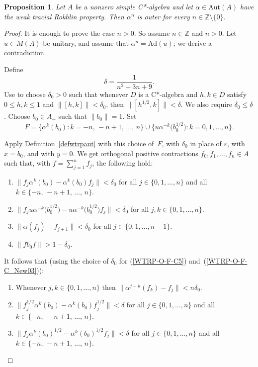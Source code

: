 \documentclass[11pt]{amsart}
\theoremstyle{plain}
\newtheorem{proposition}[theorem]{Proposition}
\theoremstyle{definition}
\theoremstyle{remark}
\numberwithin{equation}{section}
\newcounter{TmpEnumi}
\newcommand{\af}{\alpha}
\newcommand{\dt}{\delta}
\begin{document}
\begin{proposition}\label{outer}
Let $A$ be a nonzero simple C*-algebra
and let $\alpha \in \mathrm{Aut} (A)$
have the weak tracial Rokhlin property.
Then $\alpha^{n}$ is outer
for every $n \in \mathbb{Z} \setminus \{ 0 \}$.
\end{proposition}

\begin{proof}
It is enough to prove the case $n > 0$.
So assume $n \in \mathbb{Z}$ and $n > 0$.
Let $u \in M (A)$ be unitary, and assume that
$\af^n = {\mathrm{Ad}} (u)$;
we derive a contradiction.

Define
\[
\dt = \frac{1}{n^2 + 3 n + 9}.
\]
Use \cite[Lemma~2.5]{AP16} to choose
$\delta_0 > 0$ such that whenever $D$ is a C*-algebra
and $h, k \in D$ satisfy $0 \leq h, k \leq 1$
and $\| [h, k]\| < \delta_0$, then $\| [h^{1/2}, k] \| < \delta$.
We also require $\delta_0 \leq \delta$.
Choose $b_0 \in A_{+}$ such that $\| b_0 \| = 1$.
Set
\[
F = \bigl\{ \af^{k} (b_0)
       \colon k = - n, \, - n + 1, \, \ldots, \, n \bigr\}
     \cup \bigl\{ u \af^{- k} \big( b_0^{1/2} \big)
       \colon k = 0, 1, \ldots, n \bigr\}.
\]

Apply Definition~\ref{defwtrpaut} with this choice of~$F$,
with $\delta_0$ in place of $\varepsilon$,
with $x = b_0$, and with $y = 0$.
We get orthogonal positive contractions
$f_{0}, f_{1}, \ldots, f_{n} \in A$ such that,
with $f = \sum_{j = 1}^{n} f_{j}$, the following hold:
%
\begin{enumerate}
\item\label{WTRP-O-F-1a}
$\big\| f_{j} \af^{k} (b_0) - \af^{k} (b_0) f_{j} \big\| < \delta_0$
for all $j \in \{0, 1, \ldots, n \}$
and all $k \in \{ - n, \, - n + 1, \, \ldots, \, n \}$.
\item\label{WTRP-O-F-1b}
$\big\| f_{j} u \af^{- k} \big( b_0^{1/2} \big)
        - u \af^{- k} \big( b_0^{1/2} \big) f_{j} \big\|
   < \delta_0$
for all $j, k \in \{0, 1, \ldots, n \}$.
\item\label{WTRP-O-F-2}
$\|\alpha (f_{j}) - f_{j + 1} \| < \delta_0$
for all $j \in \{0, 1, \ldots, n - 1 \}$.
\item\label{WTRP-O-F-3}
$\| f b_0 f \| > 1 - \delta_0$.
\setcounter{TmpEnumi}{\value{enumi}}
\end{enumerate}
%
It follows that
(using the choice of $\dt_0$
for (\ref{WTRP-O-F-C5})
and~(\ref{WTRP-O-F-C_New03})):
%
\begin{enumerate}
\setcounter{enumi}{\value{TmpEnumi}}
%
\item\label{WTRP-O-F-C4}
Whenever $j, k \in \{0, 1, \ldots, n \}$
then $\| \af^{j - k} (f_k) - f_j \| < n \dt_0$.
%
\item\label{WTRP-O-F-C5}
$\big\| f_{j}^{1/2} \af^{k} (b_0)
     - \af^{k} (b_0) f_{j}^{1/2} \big\| < \delta$
for all $j \in \{0, 1, \ldots, n \}$
and all $k \in \{ - n, \, - n + 1, \, \ldots, \, n \}$.
%
\item\label{WTRP-O-F-C_New03}
$\big\| f_{j} \af^{k} (b_0)^{1/2}
     - \af^{k} (b_0)^{1/2} f_{j} \big\| < \delta$
for all $j \in \{0, 1, \ldots, n \}$
and all $k \in \{ - n, \, - n + 1, \, \ldots, \, n \}$.
\end{enumerate}
%


\end{proof}
\end{document}

